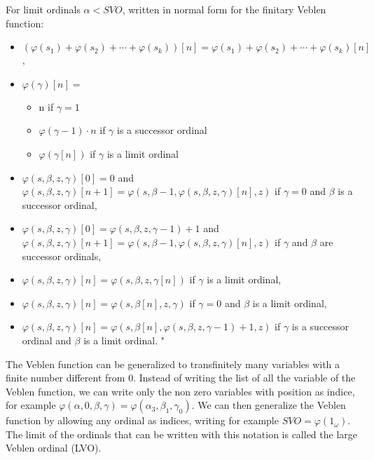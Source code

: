 \documentclass[10pt]{article}
\begin{document}
For limit ordinals \(\alpha<SVO\), written in normal form for the finitary Veblen function:

\begin{itemize}
     \setlength{\itemsep}{1pt}
     \setlength{\parskip}{0pt}
     \setlength{\parsep}{0pt}

\item \((\varphi(s_1)+\varphi(s_2)+\cdots+\varphi(s_k))[n]=\varphi(s_1)+\varphi(s_2)+\cdots+\varphi(s_k)[n]\),
\item \(\varphi(\gamma)[n]=\)
\begin{itemize}
     \setlength{\itemsep}{1pt}
     \setlength{\parskip}{0pt}
     \setlength{\parsep}{0pt}
\item n if \( \gamma=1 \)
\item \(\varphi(\gamma-1)\cdot n \) if \( \gamma \) is a successor ordinal
\item \( \varphi(\gamma[n]) \) if \( \gamma \) is a limit ordinal
\end{itemize}
\item \(\varphi(s,\beta,z,\gamma)[0]=0\) and \(\varphi(s,\beta,z,\gamma)[n+1]=\varphi(s,\beta-1,\varphi(s,\beta,z,\gamma)[n],z)\) if \(\gamma=0\) and \(\beta\) is a successor ordinal,
\item \(\varphi(s,\beta,z,\gamma)[0]=\varphi(s,\beta,z,\gamma-1)+1\) and \(\varphi(s,\beta,z,\gamma)[n+1]=\varphi(s,\beta-1,\varphi(s,\beta,z,\gamma)[n],z)\) if \(\gamma\) and \(\beta\) are successor ordinals,
\item \(\varphi(s,\beta,z,\gamma)[n]=\varphi(s,\beta,z,\gamma[n])\) if \(\gamma\) is a limit ordinal,
\item \(\varphi(s,\beta,z,\gamma)[n]=\varphi(s,\beta[n],z,\gamma)\) if \(\gamma=0\) and \(\beta\) is a limit ordinal,
\item \(\varphi(s,\beta,z,\gamma)[n]=\varphi(s,\beta[n],\varphi(s,\beta,z,\gamma-1)+1,z)\) if \(\gamma\) is a successor ordinal and \(\beta\) is a limit ordinal. "

\end{itemize}

The Veblen function can be generalized to transfinitely many variables with a finite number different from 0. Instead of writing the list of all the variable of the Veblen function, we can write only the non zero variables with position as indice, for example \( \varphi(\alpha,0,\beta,\gamma) = \varphi(\alpha_3,\beta_1,\gamma_0) \). We can then generalize the Veblen function by allowing any ordinal as indices, writing for example \( SVO = \varphi(1_\omega) \). The limit of the ordinals that can be written with this notation is called the large Veblen ordinal (LVO).
\end{document}
